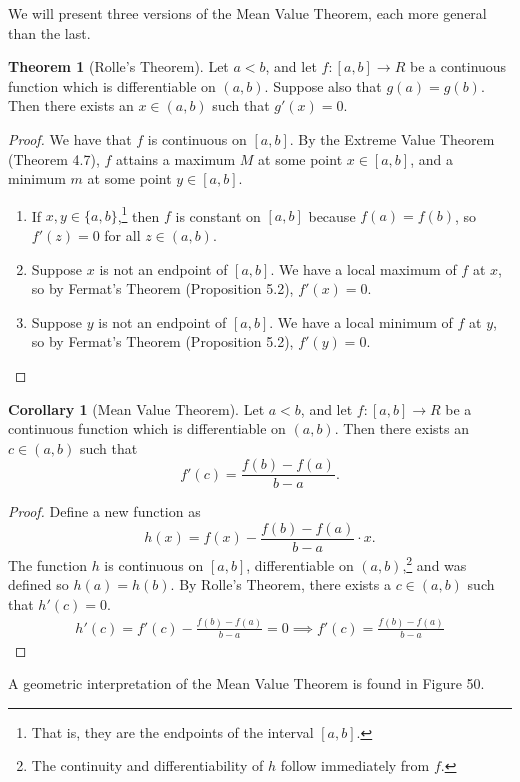 \documentclass{article}
\theoremstyle{definition}
\newtheorem{theorem}{Theorem}[section]
\newtheorem{corollary}{Corollary}[section]
\begin{document}
We will present three versions of the Mean Value Theorem, each more general than the last. 
\begin{theorem}[Rolle's Theorem]
Let $ a<b $, and let $ f:[a,b]\to R $ be a continuous function which is differentiable on $ (a,b) $. Suppose also that $ g(a)=g(b) $. Then there exists an $ x\in(a,b) $ such that $ g'(x)=0 $.
\end{theorem}
\begin{proof}
	We have that $ f $ is continuous on $ [a,b] $. By the Extreme Value Theorem (Theorem 4.7), $ f  $ attains a maximum $ M $ at some point $ x\in[a,b] $, and a minimum $ m $ at some point $ y\in[a,b] $.  
	\begin{enumerate}
		\item [Case 1.]	If $ x,y\in\{a,b\} $,\footnote{That is, they are the endpoints of the interval $ [a,b] $.} then $ f $ is constant on $ [a,b] $ because $ f(a)=f(b) $, so $ f'(z)=0 $ for all $ z\in(a,b)$.   
		\item [Case 2.] Suppose $ x $ is not an endpoint of $ [a,b] $. We have a local maximum of $ f $ at $ x $, so by Fermat's Theorem (Proposition 5.2), $ f'(x)=0 $.
		\item [Case 3.] Suppose $ y $ is not an endpoint of $ [a,b] $. We have a local minimum of $ f $ at $ y $, so by Fermat's Theorem (Proposition 5.2), $ f'(y)=0 $.
	\end{enumerate}
\end{proof}
\begin{corollary}[Mean Value Theorem] Let $ a<b $, and let $ f:[a,b]\to R $ be a continuous function which is differentiable on $ (a,b) $. Then there exists an $ c\in(a,b) $ such that $$ f'(c)=\frac{f(b)-f(a)}{b-a}.$$
\end{corollary}
\begin{proof}
	Define a new function as $$h(x)=f(x)-\frac{f(b)-f(a)}{b-a}\cdot x .$$ The function $ h $ is continuous on $ [a,b] $, differentiable on $ (a,b) $,\footnote{The continuity and differentiability of $ h $ follow immediately from $ f $.} and was defined so $ h(a)=h(b) $. By Rolle's Theorem, there exists a $ c\in(a,b) $ such that $ h'(c)=0 $. 
	\begin{align*}
		h'(c)=f'(c)-\frac{f(b)-f(a)}{b-a}=0\implies f'(c)=\frac{f(b)-f(a)}{b-a}
	\end{align*}
\end{proof}
A geometric interpretation of the Mean Value Theorem is found in Figure 50.
\end{document}
